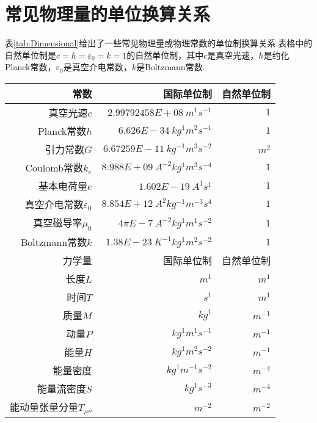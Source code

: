 \section{常见物理量的单位换算关系}\label{sec:Dimensional}
	表\ref{tab:Dimensional}给出了一些常见物理量或物理常数的单位制换算关系.表格中的自然单位制是$c=\hbar=\varepsilon_0=k=1$的自然单位制，其中$c$是真空光速，$\hbar$是约化Planck常数，$\varepsilon_0$是真空介电常数，$k$是Boltzmann常数.
	
	\begin{table}[!htbp]
		\centering
		\begin{tabular*}{\hsize}{@{}@{\extracolsep{\fill}}rrr@{}}
			\toprule
			常数							&				国际单位制					&	自然单位制	\\
			\midrule
			真空光速$c$						&	$2.99792458E+08\ m^{1}s^{-1}$			&	$1$							\\
			Planck常数$h$					&	$6.626E-34\ kg^{1}m^{2}s^{-1}$			&	$1$							\\
			引力常数$G$						&	$6.67259E-11\ kg^{-1}m^{3}s^{-2}$		&	$m^{2}$						\\
			Coulomb常数$k_e$				&	$8.988E+09\ A^{-2}kg^{1}m^{3}s^{-4}$	&	$1$							\\
			基本电荷量$e$					&	$1.602E-19\ A^{1}s^{1}$					&	$1$							\\
			真空介电常数$\varepsilon_0$		&	$8.854E+12\ A^{2}kg^{-1}m^{-3}s^{4}$	&	$1$							\\
			真空磁导率$\mu_0$				&	$4\pi E-7\ A^{-2}kg^{1}m^{1}s^{-2}$		&	$1$							\\
			Boltzmann常数$k$				&	$1.38 E-23\ K^{-1}kg^{1}m^{2}s^{-2}$	&	$1$							\\
			\midrule
			力学量							&				国际单位制					&	自然单位制	\\
			\midrule
			长度$L$							&	$m^{1}$									&	 $m^{1}$					\\
			时间$T$							&	$s^{1}$									&	 $m^{1}$					\\
			质量$M$							&	$kg^{1}$								&	 $m^{-1}$					\\
			动量$P$							&	$kg^{1}m^{1}s^{-1}$						&	 $m^{-1}$					\\
			能量$H$							&	$kg^{1}m^{2}s^{-2}$						&	$m^{-1}$					\\
			能量密度						&	$kg^{1}m^{-1}s^{-2}$					&	$m^{-4}$					\\
			能量流密度$S$					&	$kg^{1}s^{-3}$							&	$m^{-4}$					\\
			能动量张量分量$T_{\mu\nu}$		&	$m^{-2}$								&	$m^{-2}$					\\

\end{tabular*}
\end{table}
